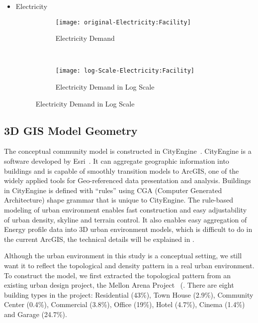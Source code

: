 \begin{itemize}
\pagebreak
\item Electricity
\begin{figure}[h!]
  \centering
  \begin{subfigure}{0.4\textwidth}
  \centering
  \texttt{[image: original-Electricity:Facility]}
  \caption[Electricity  Demand]{Electricity Demand}
  \label{fig:original-Electricity:Facility}
\end{subfigure}
~
\begin{subfigure}{0.4\textwidth}
  \centering
  \texttt{[image: log-Scale-Electricity:Facility]}
  \caption[Electricity  Demand]{Electricity  Demand in Log Scale}
  \label{fig:log-Scale-Electricity:Facility}
\end{subfigure}
  \caption[Electricity  Demand Log]{Electricity Demand in Log Scale}
\end{figure}

\end{itemize}

\pagebreak
\subsection{3D GIS Model Geometry}
The conceptual community model is constructed in
CityEngine~\cite{cityEngine2015}. CityEngine is a software developed
by Esri~\cite{Esri2015}. It can aggregate geographic information into
buildings and is capable of smoothly transition models to
ArcGIS\cite{ArcGIS2015}, one of the widely applied tools for
Geo-referenced data presentation and analysis. Buildings in CityEngine
is defined with ``rules'' using CGA (Computer Generated Architecture)
shape grammar that is unique to CityEngine. The rule-based modeling of
urban environment enables fast construction and easy adjustability of
urban density, skyline and terrain control. It also enables easy
aggregation of Energy profile data into 3D urban environment models,
which is difficult to do in the current ArcGIS, the technical details
will be explained in .

Although the urban environment in this study is a conceptual setting,
we still want it to reflect the topological and density pattern in a
real urban environment. To construct the model, we first extracted the
topological pattern from an existing urban design project, the Mellon
Arena Project~\cite{baird2014} (.  There are
eight building types in the project: Residential (43\%), Town House
(2.9\%), Community Center (0.4\%), Commercial (3.8\%), Office (19\%),
Hotel (4.7\%), Cinema (1.4\%) and Garage (24.7\%).

